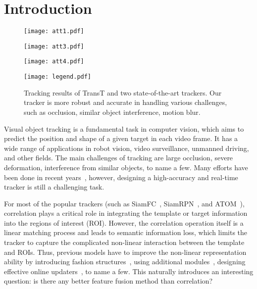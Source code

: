 \documentclass[final]{cvpr}
\begin{document}
\section{Introduction}


\begin{figure}[!t]
\begin{center}
\texttt{[image: att1.pdf]}
\end{center}
\vspace{-0.75cm}
\begin{center}
\texttt{[image: att3.pdf]}
\end{center}
\vspace{-0.75cm}
\begin{center}
\texttt{[image: att4.pdf]}
\end{center}
\vspace{-0.8cm}
\begin{center}
\texttt{[image: legend.pdf]}
\end{center}
\vspace{-2mm}
\caption{Tracking results of TransT and two state-of-the-art trackers. Our tracker is more robust 
and accurate in handling various challenges, such as occlusion, similar object interference, motion blur.}
\label{fig:visual}
\end{figure}

Visual object tracking is a fundamental task in computer vision, which aims to predict 
the position and shape of a given target in each video frame. 
It has a wide range of applications in robot vision, video surveillance, unmanned driving,  
and other fields. 
The main challenges of tracking are large occlusion, severe deformation, interference from 
similar objects, to name a few. 
Many efforts have been done in recent years~\cite{DVT-Review,DVT-review-new}, however, designing 
a high-accuracy and real-time tracker is still a challenging task. 

For most of the popular trackers (such as SiamFC~\cite{SiameseFC}, SiamRPN~\cite{SiameseRPN}, and ATOM~\cite{ATOM}), correlation 
plays a critical role in integrating the template or target information into the regions of interest (ROI). 
However, the correlation operation itself is a linear matching process and leads to semantic information loss, 
which limits the tracker to capture the complicated non-linear interaction between the template and ROIs. 
Thus, previous models have to improve the non-linear representation ability by introducing fashion
structures~\cite{SiamRPNplusplus,SiamFC++,Ocean}, using additional modules~\cite{MLT,DSA,CGACD}, 
designing effective online updaters~\cite{DiMP,UpdateNet,PrDiMP}, to name a few.  
This naturally introduces an interesting question: is there any better feature fusion method than correlation? 
\end{document}
